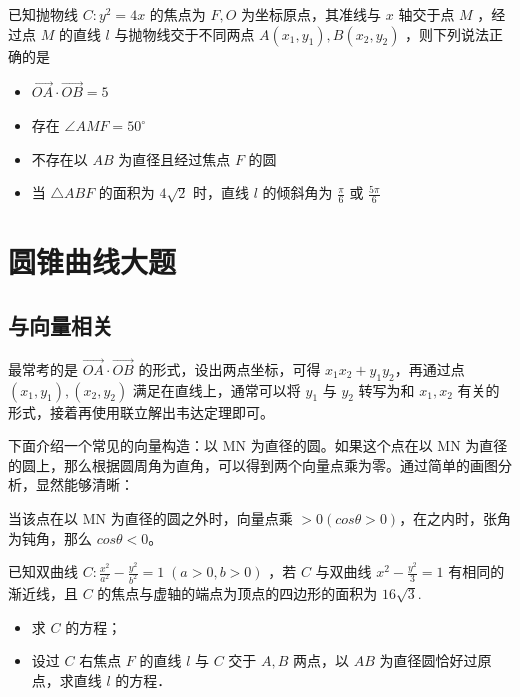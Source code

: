 \begin{problem}
已知抛物线 $C: y^{2}=4x$ 的焦点为 $F, O$ 为坐标原点，其准线与 $x$ 轴交于点 $M$ ，经过点 $M$ 的直线 $l$ 与抛物线交于不同两点 $A(x_{1}, y_{1}), B(x_{2}, y_{2})$ ，则下列说法正确的是
\begin{itemize}
    \item $\overrightarrow{OA} \cdot \overrightarrow{OB}=5$
    \item 存在 $\angle AMF=50^{\circ}$
    \item 不存在以 $AB$ 为直径且经过焦点 $F$ 的圆
    \item 当 $\triangle ABF$ 的面积为 $4 \sqrt{2}$ 时，直线 $l$ 的倾斜角为 $\frac{\pi}{6}$ 或 $\frac{5 \pi}{6}$
\end{itemize}
\end{problem}

\section{圆锥曲线大题}

\subsection{与向量相关}

\begin{tips}
    最常考的是 $\overrightarrow{OA} \cdot \overrightarrow{OB}$ 的形式，设出两点坐标，可得 $x_1x_2 + y_1y_2$，再通过点 $(x_1, y_1), (x_2, y_2)$ 满足在直线上，通常可以将 $y_1$ 与 $y_2$ 转写为和 $x_1, x_2$ 有关的形式，接着再使用联立解出韦达定理即可。
\end{tips}

\vspace{1em}

\begin{theorem}
    下面介绍一个常见的向量构造：以 MN 为直径的圆。如果这个点在以 MN 为直径的圆上，那么根据圆周角为直角，可以得到两个向量点乘为零。通过简单的画图分析，显然能够清晰：

    当该点在以 MN 为直径的圆之外时，向量点乘 $> 0 (cos\theta > 0)$，在之内时，张角为钝角，那么 $cos\theta < 0 $。
\end{theorem}

\vspace{1em}

\begin{example}
    已知双曲线 $C: \frac{x^{2}}{a^{2}}-\frac{y^{2}}{b^{2}}=1\;(a>0, b>0)$ ，若 $C$ 与双曲线 $x^{2}-\frac{y^{2}}{3}=1$ 有相同的渐近线，且 $C$ 的焦点与虚轴的端点为顶点的四边形的面积为 $16 \sqrt{3}$.

    \begin{itemize}
        \item 求 $C$ 的方程；
        \item 设过 $C$ 右焦点 $F$ 的直线 $l$ 与 $C$ 交于 $A, B$ 两点，以 $AB$ 为直径圆恰好过原点，求直线 $l$ 的方程．
    \end{itemize}
\end{example}

